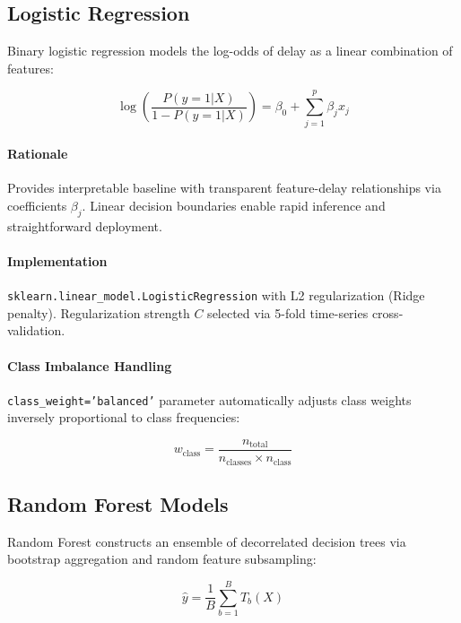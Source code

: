 \documentclass{report}
\begin{document}
\subsection{Logistic Regression}
\label{sec:logistic_regression}

Binary logistic regression models the log-odds of delay as a linear combination of features:

\begin{equation}
\log\left(\frac{P(y=1|X)}{1-P(y=1|X)}\right) = \beta_0 + \sum_{j=1}^{p} \beta_j x_j
\end{equation}

\paragraph{Rationale}

Provides interpretable baseline with transparent feature-delay relationships via coefficients $\beta_j$. Linear decision boundaries enable rapid inference and straightforward deployment.

\paragraph{Implementation}

\texttt{sklearn.linear\_model.LogisticRegression} with L2 regularization (Ridge penalty). Regularization strength $C$ selected via 5-fold time-series cross-validation.

\paragraph{Class Imbalance Handling}

\texttt{class\_weight='balanced'} parameter automatically adjusts class weights inversely proportional to class frequencies:

\begin{equation}
w_{\text{class}} = \frac{n_{\text{total}}}{n_{\text{classes}} \times n_{\text{class}}}
\end{equation}

\subsection{Random Forest Models}
\label{sec:random_forest}

Random Forest constructs an ensemble of decorrelated decision trees via bootstrap aggregation and random feature subsampling:

\begin{equation}
\hat{y} = \frac{1}{B} \sum_{b=1}^{B} T_b(X)
\end{equation}
\end{document}
